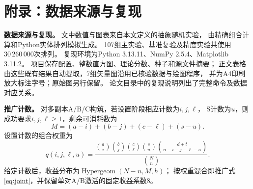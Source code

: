 \appendix
\section*{附录：数据来源与复现}
\noindent\textbf{数据来源与复现。}
文中数值与图表来自本文定义的抽象随机实验，
由精确组合计算和Python实体排列模拟生成。
107组主实验、基准复验及精度实验共使用$30\,260\,000$次排列。
复现环境为Python 3.13.11、NumPy 2.5.4、Matplotlib 3.11.2。
项目保存配置、整数直方图、理论分数、种子和源文件摘要；
正文表格由这些既有结果自动提取，7组矢量图沿用已核验数据与绘图程序，
并为A4印刷放大标注字号；原始图另行保留。
论文目录中的复现说明列出了完整命令及数据对应关系。

\medskip
\noindent\textbf{推广计数。}
对多副本A/B/C构筑，若设置阶段相应计数为$i,j,\ell$，
S计数为$u$，则成功要求$i,j,\ell\ge1$，剩余可消耗数为
\[
M=(a-i)+(b-j)+(c-\ell)+(s-u).
\]
设置计数的组合权重为
\[
q(i,j,\ell,u)=
\frac{\binom ai\binom bj\binom c\ell\binom su
\binom{d+t}{n-i-j-\ell-u}}{\binom Nn}.
\]
给定计数后，收益分布为$\operatorname{Hypergeom}(N-n,M,h)$；
按权重混合即推广式\eqref{eq:joint}，并保留单对A/B激活的固定收益系数8。
